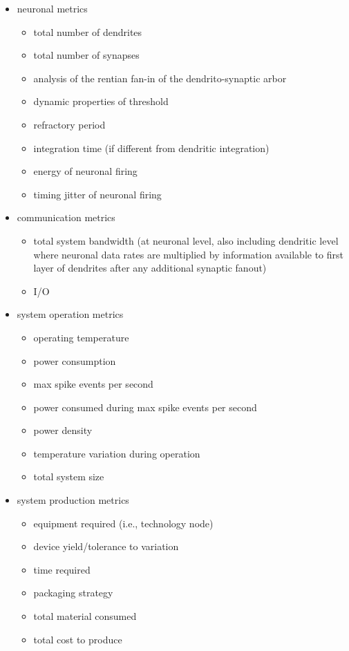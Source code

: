 \documentclass[twocolumn]{article}
\begin{document}
\begin{itemize}
\item neuronal metrics
\begin{itemize}
\item total number of dendrites
\item total number of synapses
\item analysis of the rentian fan-in of the dendrito-synaptic arbor
\item dynamic properties of threshold
\item refractory period
\item integration time (if different from dendritic integration)
\item energy of neuronal firing
\item timing jitter of neuronal firing
\end{itemize}

\item communication metrics
\begin{itemize}
\item total system bandwidth (at neuronal level, also including dendritic level where neuronal data rates are multiplied by information available to first layer of dendrites after any additional synaptic fanout)
\item I/O 
\end{itemize}

\item system operation metrics
\begin{itemize}
\item operating temperature
\item power consumption
\item max spike events per second
\item power consumed during max spike events per second
\item power density
\item temperature variation during operation
\item total system size
\end{itemize}

\item system production metrics
\begin{itemize}
\item equipment required (i.e., technology node)
\item device yield/tolerance to variation
\item time required
\item packaging strategy
\item total material consumed
\item total cost to produce 
\end{itemize}

\end{itemize}
\end{document}
